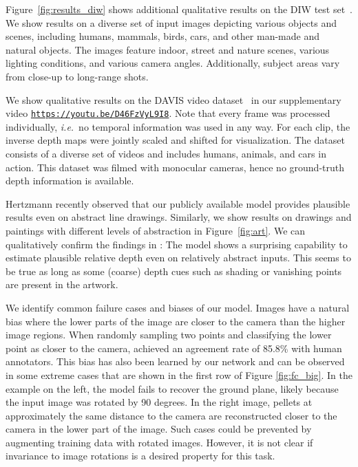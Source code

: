 Figure~\ref{fig:results_diw} shows additional qualitative results on the DIW test set~\cite{Chen2016}. We show results on a diverse set of input images depicting various objects and scenes, including humans, mammals, birds, cars, and other man-made and natural objects. The images feature indoor, street and nature scenes, various lighting conditions, and various camera angles. Additionally, subject areas vary from close-up to long-range shots.

We show qualitative results on the DAVIS video dataset~\cite{Perazzi2016} in our supplementary video \href{https://youtu.be/D46FzVyL9I8}{\small\texttt{https://youtu.be/D46FzVyL9I8}}.
Note that every frame was processed individually, \MakeLowercase{\textit{i.e.}}\ no temporal information was used in any way. For each clip, the inverse depth maps were jointly scaled and shifted for visualization. The dataset consists of a diverse set of videos and includes humans, animals, and cars in action. This dataset was filmed with monocular cameras, hence no ground-truth depth information is available.

Hertzmann \cite{Hertzmann2020} recently observed that our publicly available model provides plausible results even on abstract line drawings. Similarly, we show results on drawings and paintings with different levels of abstraction in
Figure~\ref{fig:art}. We can qualitatively confirm the findings in \cite{Hertzmann2020}: The model shows a surprising capability to estimate plausible relative depth even on relatively abstract inputs. This seems to be true as long as some (coarse) depth cues such as shading or vanishing points are present in the artwork.

 We identify common failure cases and biases of our model. Images have a natural bias where the lower parts of the image are closer to the camera than the higher image regions. When randomly sampling two points and classifying the lower point as closer to the camera, \cite{Chen2016} achieved an agreement rate of 85.8\% with human annotators. This bias has also been learned by our network and can be observed in some extreme cases that are shown in the first row of Figure \ref{fig:fc_big}.
In the example on the left, the model fails to recover the ground plane, likely because the input image was rotated by 90 degrees. In the right image, pellets at approximately the same distance to the camera are reconstructed closer to the camera in the lower part of the image. Such cases could be prevented by augmenting training data with rotated images. However, it is not clear if invariance to image rotations is a desired property for this task.

